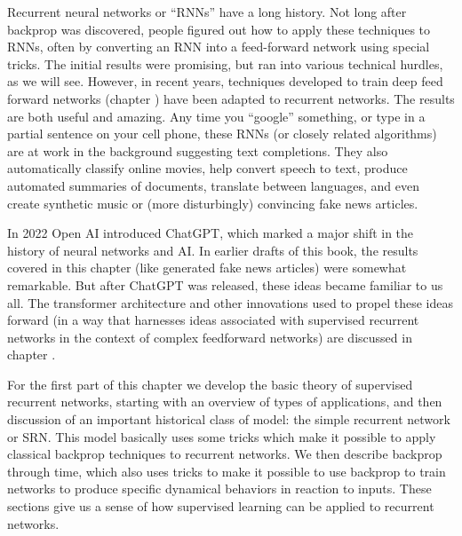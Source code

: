 Recurrent neural networks or ``RNNs'' have a long history. Not long after backprop was discovered, people figured out how to apply these techniques to RNNs, often by converting an RNN into a feed-forward network using special tricks. The initial results were promising, but ran into various technical hurdles, as we will see. However, in recent years, techniques developed to train deep feed forward networks (chapter ) have been adapted to recurrent networks. The results are both useful and amazing. Any time you ``google'' something, or type in a partial sentence on your cell phone, these RNNs (or closely related algorithms) are at work in the background suggesting text completions. They also automatically classify online movies, help convert speech to text, produce automated summaries of documents, translate between languages, and even create synthetic music or (more disturbingly) convincing fake news articles.

In 2022 Open AI introduced ChatGPT, which marked a major shift in the history of neural networks and AI. In earlier drafts of this book, the results covered in this chapter (like generated fake news articles) were somewhat remarkable. But after ChatGPT was released, these ideas became familiar to us all. The transformer architecture and other innovations used to propel these ideas forward (in a way that harnesses ideas associated with supervised recurrent networks in the context of complex feedforward networks) are discussed in chapter . 

For the first part of this chapter we develop the basic theory of supervised recurrent networks, starting with an overview of types of applications, and then discussion of an important historical class of model: the simple recurrent network or SRN. This model basically uses some tricks which make it possible to apply classical backprop techniques to recurrent networks. We then describe backprop through time, which also uses tricks to make it possible to use backprop to train networks to produce specific dynamical behaviors in reaction to inputs. These sections give us a sense of how supervised learning can be applied to recurrent networks. 

